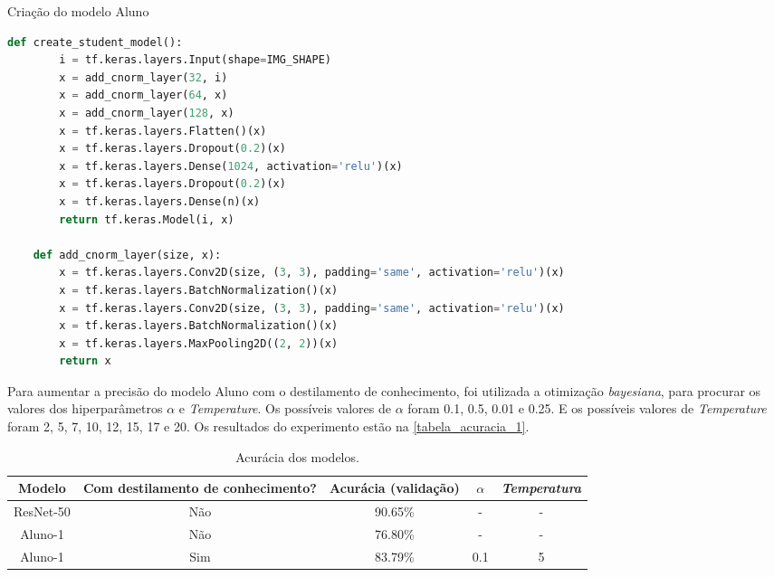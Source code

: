 \begin{codigo}[!htb]
    \caption{Criação do modelo Aluno}
    \label{res_aluno_1}
    \begin{lstlisting}[language = python]
	def create_student_model():
		i = tf.keras.layers.Input(shape=IMG_SHAPE)
		x = add_cnorm_layer(32, i)
		x = add_cnorm_layer(64, x)
		x = add_cnorm_layer(128, x)
		x = tf.keras.layers.Flatten()(x)
		x = tf.keras.layers.Dropout(0.2)(x)
		x = tf.keras.layers.Dense(1024, activation='relu')(x)
		x = tf.keras.layers.Dropout(0.2)(x)
		x = tf.keras.layers.Dense(n)(x)
		return tf.keras.Model(i, x)

	def add_cnorm_layer(size, x):
		x = tf.keras.layers.Conv2D(size, (3, 3), padding='same', activation='relu')(x)
		x = tf.keras.layers.BatchNormalization()(x)
		x = tf.keras.layers.Conv2D(size, (3, 3), padding='same', activation='relu')(x)
		x = tf.keras.layers.BatchNormalization()(x)
		x = tf.keras.layers.MaxPooling2D((2, 2))(x)
		return x
    \end{lstlisting}
\end{codigo}

Para aumentar a precisão do modelo Aluno com o destilamento de conhecimento, foi utilizada a otimização
\textit{bayesiana}, para procurar os valores dos hiperparâmetros $\alpha$ e \textit{Temperature}.
Os possíveis valores de $\alpha$ foram 0.1, 0.5, 0.01 e 0.25.
E os possíveis valores de \textit{Temperature} foram 2, 5, 7, 10, 12, 15, 17 e 20.
Os resultados do experimento estão na \autoref{tabela_acuracia_1}.

\begin{center}
\begin{table}[htb]
\ABNTEXfontereduzida
\caption[Acurácia dos modelos]{Acurácia dos modelos.}
\label{tabela_acuracia_1}
\begin{tabular}{ |c|c|c|c|c| }
	\hline
	\textbf{Modelo} & \textbf{Com destilamento de conhecimento?}  & \textbf{Acurácia (validação)}
		   & \textbf{$\alpha$} & \textbf{\textit{Temperatura}} \\
	\hline
	ResNet-50 	& 	Não 	& 	90.65\%	& 	- 	& 	-	 \\
	Aluno-1 	& 	Não 	& 	76.80\%	& 	- 	& 	-	 \\
	Aluno-1 	& 	Sim 	& 	83.79\%	& 	0.1 	& 	5	 \\
	\hline
\end{tabular}
\end{table}
\end{center}


